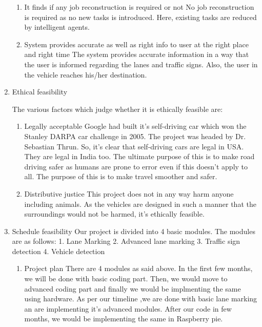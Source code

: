 \documentclass[12pt,a4paper,final]{article}
\begin{document}
\begin{flushleft}
\begin{enumerate}
\begin{enumerate}
\item It finds if any job reconstruction is required or not
    No job reconstruction is required as no new tasks is introduced. Here, existing tasks are reduced by intelligent agents. 

\item System provides accurate as well as right info to user at the right place and right time
    The system provides accurate information in a way that the user is informed regarding the lanes and traffic signs. Also, the user in the vehicle reaches his/her destination. 
\end{enumerate}

\item Ethical feasibility

    The various factors which judge whether it is ethically feasible are: 
\begin{enumerate}


\item Legally acceptable
    Google had built it's self-driving car which won the Stanley DARPA car challenge in 2005. The project was headed by Dr. Sebastian Thrun. So, it's clear that self-driving cars are legal in USA. They are legal in India too. The ultimate purpose of this is to make road driving safer as humans are prone to error even if this doesn't apply to all. The purpose of this is to make travel smoother and safer. 

\item Distributive justice
    This project does not in any way harm anyone including animals. As the vehicles are designed in such a manner that the surroundings would not be harmed, it's ethically feasible.  
\end{enumerate} 
\item Schedule feasibility
Our project is divided into 4 basic modules. The modules are as follows:
1. Lane Marking
2. Advanced lane marking
3. Traffic sign detection
4. Vehicle detection
\begin{enumerate}

    
\item Project plan
    There are 4 modules as said above. In the first few months, we will be done with basic coding part. Then, we would move to advanced coding part and finally we would be implmenting the same using hardware. As per our timeline ,we are done with basic lane marking an are implementing it's advanced modules. After our code in few months, we would be implementing the same in Raspberry pie. 


\end{enumerate}
\end{enumerate}
\end{flushleft}
\end{document}
